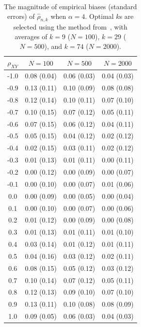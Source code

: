 \documentclass[lineno]{biometrika}
\newcommand \ag{\alpha}
\begin{document}
\begin{table}[ht]
\centering
\caption{The magnitude of empirical biases (standard errors) of $\hat{\rho}_{n,k}$ when $\ag=4$. Optimal $k$s are selected using the method from~\citet{danielsson:Ergun:deHaan:deVries:2016}, with averages of $k=9$ ($N=100$), $k=29$ ($N=500$), and  $k=74$ ($N=2000$).
\label{t:sim3}}
\medskip
\begin{tabular}{cccc}
  \hline\hline
 $\rho_{XY}$ & $N=100$ &  $N=500$ & $N=2000$  \\
  \hline
-1.0 & 0.08 (0.04) & 0.06 (0.03) & 0.04 (0.03) \\
-0.9 & 0.13 (0.11) & 0.10 (0.09) & 0.08 (0.08) \\
-0.8 & 0.12 (0.14) & 0.10 (0.11) & 0.07 (0.10) \\
-0.7 & 0.10 (0.15) & 0.07 (0.12) & 0.05 (0.11) \\
-0.6 & 0.07 (0.15) & 0.06 (0.12) & 0.04 (0.11) \\
-0.5 & 0.05 (0.15) & 0.04 (0.12) & 0.02 (0.12) \\
-0.4 & 0.02 (0.15) & 0.03 (0.11) & 0.02 (0.12) \\
-0.3 & 0.01 (0.13) & 0.01 (0.11) & 0.00 (0.11) \\
-0.2 & 0.00 (0.12) & 0.00 (0.09) & 0.00 (0.07) \\
-0.1 & 0.00 (0.10) & 0.00 (0.07) & 0.01 (0.06) \\
0.0 & 0.00 (0.09) & 0.00 (0.05) & 0.00 (0.04) \\
0.1 & 0.00 (0.10) & 0.00 (0.07) & 0.00 (0.06) \\
0.2 & 0.01 (0.12) & 0.00 (0.09) & 0.00 (0.08) \\
0.3 & 0.01 (0.13) & 0.01 (0.11) & 0.01 (0.10) \\
0.4 & 0.03 (0.14) & 0.01 (0.12) & 0.01 (0.11) \\
0.5 & 0.04 (0.16) & 0.03 (0.12) & 0.02 (0.11) \\
0.6 & 0.08 (0.15) & 0.05 (0.12) & 0.03 (0.12) \\
0.7 & 0.10 (0.14) & 0.07 (0.12) & 0.05 (0.11) \\
0.8 & 0.12 (0.13) & 0.09 (0.10) & 0.07 (0.10) \\
0.9 & 0.13 (0.11) & 0.10 (0.08) & 0.08 (0.09) \\
1.0 & 0.09 (0.05) & 0.06 (0.03) & 0.04 (0.03) \\
\hline\hline
\end{tabular}
\end{table}
\end{document}

